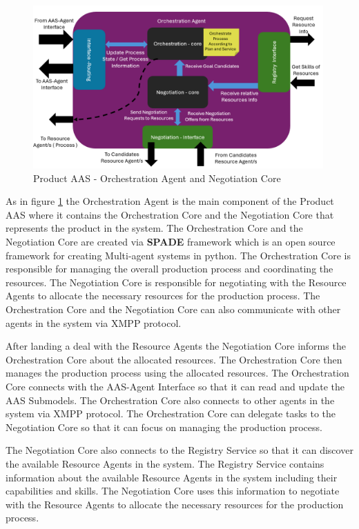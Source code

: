 \begin{figure}[h]
    \centering
    \includegraphics[width=0.99\textwidth]{Images/Production_Agent_Orchestration_Overview.png}
    \caption{Product AAS - Orchestration Agent and Negotiation Core}
    \label{fig:product_aas_orchestration_agent}
\end{figure}

As in figure \ref{fig:product_aas_orchestration_agent} the Orchestration Agent is the main component of the Product AAS where it contains the Orchestration Core and the Negotiation Core that represents the product in the system.
The Orchestration Core and the Negotiation Core are created via \textbf{SPADE} framework which is an open source framework for creating Multi-agent systems in python.
The Orchestration Core is responsible for managing the overall production process and coordinating the resources.
The Negotiation Core is responsible for negotiating with the Resource Agents to allocate the necessary resources for the production process.
The Orchestration Core and the Negotiation Core can also communicate with other agents in the system via XMPP protocol.

After landing a deal with the Resource Agents the Negotiation Core informs the Orchestration Core about the allocated resources.
The Orchestration Core then manages the production process using the allocated resources.
The Orchestration Core connects with the AAS-Agent Interface so that it can read and update the AAS Submodels.
The Orchestration Core also connects to other agents in the system via XMPP protocol.
The Orchestration Core can delegate tasks to the Negotiation Core so that it can focus on managing the production process.

The Negotiation Core also connects to the Registry Service so that it can discover the available Resource Agents in the system.
The Registry Service contains information about the available Resource Agents in the system including their capabilities and skills.
The Negotiation Core uses this information to negotiate with the Resource Agents to allocate the necessary resources for the production process.
